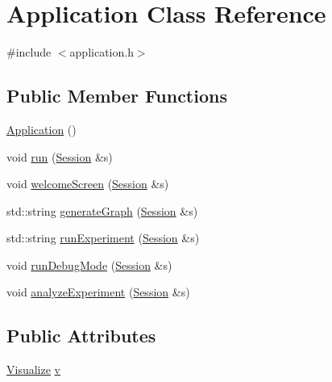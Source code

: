 \hypertarget{class_application}{}\section{Application Class Reference}
\label{class_application}


{\ttfamily \#include $<$application.\+h$>$}

\subsection*{Public Member Functions}
\begin{DoxyCompactItemize}
\item 
\hyperlink{class_application_afa8cc05ce6b6092be5ecdfdae44e05f8_afa8cc05ce6b6092be5ecdfdae44e05f8}{Application} ()
\item 
void \hyperlink{class_application_adecc88549e44815bd94985ea043b733f_adecc88549e44815bd94985ea043b733f}{run} (\hyperlink{struct_session}{Session} \&s)
\item 
void \hyperlink{class_application_abf73a60a6a2e4b83a675de777273d12c_abf73a60a6a2e4b83a675de777273d12c}{welcome\+Screen} (\hyperlink{struct_session}{Session} \&s)
\item 
std\+::string \hyperlink{class_application_a169c37596e9a7a9e0546700876adcbe7_a169c37596e9a7a9e0546700876adcbe7}{generate\+Graph} (\hyperlink{struct_session}{Session} \&s)
\item 
std\+::string \hyperlink{class_application_a1d9cfbea705655427e7d1847de2567c1_a1d9cfbea705655427e7d1847de2567c1}{run\+Experiment} (\hyperlink{struct_session}{Session} \&s)
\item 
void \hyperlink{class_application_adb639e3593f8f6f4dcb3d89d690eb538_adb639e3593f8f6f4dcb3d89d690eb538}{run\+Debug\+Mode} (\hyperlink{struct_session}{Session} \&s)
\item 
void \hyperlink{class_application_ae0d3919fe03bae0b3ce31ef4be49374d_ae0d3919fe03bae0b3ce31ef4be49374d}{analyze\+Experiment} (\hyperlink{struct_session}{Session} \&s)
\end{DoxyCompactItemize}
\subsection*{Public Attributes}
\begin{DoxyCompactItemize}
\item 
\hyperlink{class_visualize}{Visualize} \hyperlink{class_application_a96cff2295a95d7e6de06638bb7e61243_a96cff2295a95d7e6de06638bb7e61243}{v}
\end{DoxyCompactItemize}


